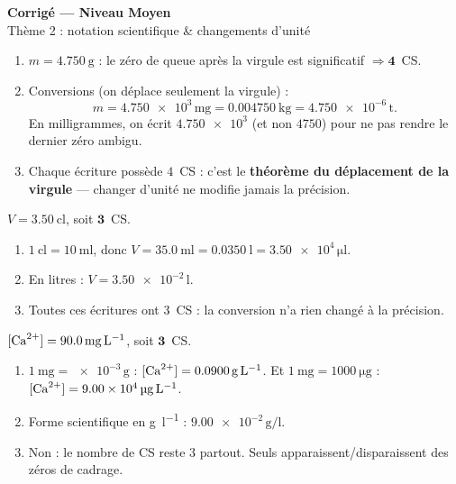 \documentclass[11pt,a4paper]{article}
\begin{document}
\begin{center}
{\Large\bfseries\color{primarydark} Corrigé — Niveau Moyen}\\[1pt]
{\color{primary} Thème 2 : notation scientifique \& changements d'unité}
\end{center}
\vspace{2mm}

\begin{cor}
\begin{enumerate}[label=\alph*),leftmargin=1.6em,itemsep=1pt]
  \item $m=\qty{4,750}{\gram}$ : le zéro de queue après la virgule est significatif $\Rightarrow \mathbf{4}$~CS.
  \item Conversions (on déplace seulement la virgule) :
        \[ m=\num{4,750e3}\,\si{\milli\gram}=\qty{0,004750}{\kilo\gram}=\num{4,750e-6}\,\si{\tonne}. \]
        En milligrammes, on écrit $\num{4,750e3}$ (et non $\num{4750}$) pour ne pas rendre le dernier
        zéro ambigu.
  \item Chaque écriture possède $4$~CS : c'est le \textbf{théorème du déplacement de la virgule} —
        changer d'unité ne modifie jamais la précision.
\end{enumerate}
\end{cor}

\begin{cor}
$V=\qty{3,50}{\centi\litre}$, soit $\mathbf{3}$~CS.
\begin{enumerate}[label=\alph*),leftmargin=1.6em,itemsep=1pt]
  \item $\qty{1}{\centi\litre}=\qty{10}{\milli\litre}$, donc $V=\qty{35,0}{\milli\litre}
        =\qty{0,0350}{\litre}=\num{3,50e4}\,\si{\micro\litre}$.
  \item En litres : $\boxed{V=\num{3,50e-2}\,\si{\litre}}$.
  \item Toutes ces écritures ont $3$~CS : la conversion n'a rien changé à la précision.
\end{enumerate}
\end{cor}

\begin{cor}
$[\ce{Ca^{2+}}]=\qty{90,0}{\milli\gram\per\litre}$, soit $\mathbf{3}$~CS.
\begin{enumerate}[label=\alph*),leftmargin=1.6em,itemsep=1pt]
  \item $\qty{1}{\milli\gram}=\num{e-3}\,\si{\gram}$ : $[\ce{Ca^{2+}}]=\qty{0,0900}{\gram\per\litre}$.
        Et $\qty{1}{\milli\gram}=\qty{1000}{\micro\gram}$ : $[\ce{Ca^{2+}}]=\num{9,00e4}\,\si{\micro\gram\per\litre}$.
  \item Forme scientifique en \si{\gram\per\litre} : $\num{9,00e-2}\,\si{\gram\per\litre}$.
  \item Non : le nombre de CS reste $3$ partout. Seuls apparaissent/disparaissent des zéros de cadrage.
\end{enumerate}
\end{cor}
\end{document}
